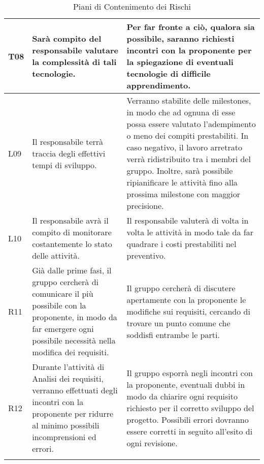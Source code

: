 \begin{longtable}{|C{.11\textwidth}|C{.40\textwidth}|C{.40\textwidth}|}
T08 & Sarà compito del responsabile valutare la complessità di tali tecnologie. & Per far fronte a ciò, qualora sia possibile, saranno richiesti incontri con la proponente per la spiegazione di eventuali tecnologie di difficile apprendimento.\\
\hline
L09 & Il responsabile terrà traccia degli effettivi tempi di sviluppo. & Verranno stabilite delle milestones, in modo che ad ognuna di esse possa essere valutato l'adempimento o meno dei compiti prestabiliti. In caso negativo, il lavoro arretrato verrà ridistribuito tra i membri del gruppo. Inoltre, sarà possibile ripianificare le attività fino alla prossima milestone con maggior precisione. \\
\hline
{}L10 & Il responsabile avrà il compito di monitorare costantemente lo stato delle attività. & Il responsabile valuterà di volta in volta le attività in modo tale da far quadrare i costi prestabiliti nel preventivo.\\
\hline
R11 & Già dalle prime fasi, il gruppo cercherà di comunicare il più possibile con la proponente, in modo da far emergere ogni possibile necessità nella modifica dei requisiti. & Il gruppo cercherà di discutere apertamente con la proponente le modifiche sui requisiti, cercando di trovare un punto comune che soddisfi entrambe le parti. \\
\hline
{}R12 & Durante l'attività di Analisi dei requisiti, verranno effettuati degli incontri con la proponente per ridurre al minimo possibili incomprensioni ed errori.  & Il gruppo esporrà negli incontri con la proponente, eventuali dubbi in modo da chiarire ogni requisito richiesto per il corretto sviluppo del progetto. Possibili errori dovranno essere corretti in seguito all'esito di ogni revisione.\\
\hline
\caption{Piani di Contenimento dei Rischi
\label{table:Contenimento Rischi}}
\end{longtable}
